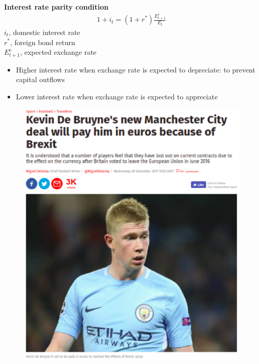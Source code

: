 \documentclass{beamer}
\begin{document}
\begin{frame}
  \textbf{Interest rate parity condition}
  \begin{align}
    1+i_t = (1+r^*) \frac{E^e_{t+1}}{E_t}
  \end{align}
  $i_t$, domestic interest rate\\
  $r^*$, foreign bond return\\
  $E^e_{t+1}$, expected exchange rate\\
  \begin{itemize}
    \item Higher interest rate when exchange rate is expected to depreciate: to prevent capital outflows
    \item Lower interest rate when exchange rate is expected to appreciate
  \end{itemize}
\end{frame}

\begin{frame}
  \begin{figure}
    \includegraphics[scale=.5]{de_bruyne.eps}
  \end{figure}
\end{frame}
\end{document}
